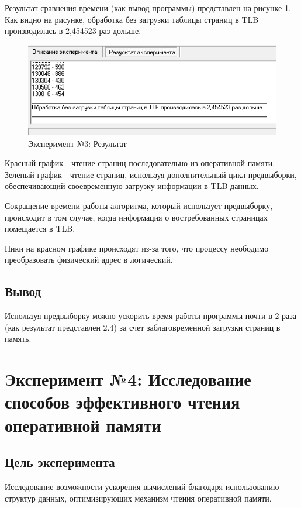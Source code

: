 Результат сравнения времени (как вывод программы) представлен на рисунке \ref{ex:t3-data}. Как видно на рисунке, обработка без загрузки таблицы страниц в TLB производилась в 2,454523 раз дольше.

\begin{figure}[h]
	\centering
	\includegraphics[height=0.15\textheight]{img/t3-data}
	\caption{Эксперимент №3: Результат}
	\label{ex:t3-data}
\end{figure}

Красный график - чтение страниц последовательно из оперативной памяти. Зеленый график - чтение страниц, используя дополнительный цикл предвыборки, обеспечивающий своевременную загрузку информации в TLB данных.

Сокращение времени работы алгоритма, который использует предвыборку, происходит в том случае, когда информация о востребованных страницах помещается в TLB. 

Пики на красном графике происходят из-за того, что процессу неободимо преобразовать физический адрес в логический.

\subsection*{Вывод}
Используя предвыборку можно ускорить время работы программы почти в 2 раза (как результат представлен 2.4) за счет заблаговременной загрузки страниц в память.

\newpage

\section*{Эксперимент №4: Исследование способов эффективного чтения оперативной памяти}

\subsection*{Цель эксперимента}
Исследование возможности ускорения вычислений благодаря использованию структур данных, оптимизирующих механизм чтения оперативной памяти.

